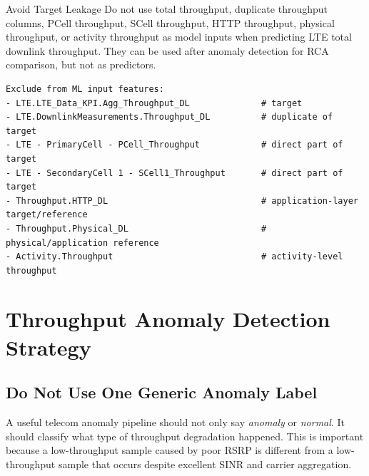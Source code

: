 \documentclass[12pt,a4paper]{article}
\begin{document}
\begin{warningbox}{Avoid Target Leakage}
Do not use total throughput, duplicate throughput columns, PCell throughput, SCell throughput, HTTP throughput, physical throughput, or activity throughput as model inputs when predicting LTE total downlink throughput. They can be used after anomaly detection for RCA comparison, but not as predictors.
\end{warningbox}

\begin{lstlisting}
Exclude from ML input features:
- LTE.LTE_Data_KPI.Agg_Throughput_DL              # target
- LTE.DownlinkMeasurements.Throughput_DL          # duplicate of target
- LTE - PrimaryCell - PCell_Throughput            # direct part of target
- LTE - SecondaryCell 1 - SCell1_Throughput       # direct part of target
- Throughput.HTTP_DL                              # application-layer target/reference
- Throughput.Physical_DL                          # physical/application reference
- Activity.Throughput                             # activity-level throughput
\end{lstlisting}

\section{Throughput Anomaly Detection Strategy}

\subsection{Do Not Use One Generic Anomaly Label}

A useful telecom anomaly pipeline should not only say \textit{anomaly} or \textit{normal}. It should classify what type of throughput degradation happened. This is important because a low-throughput sample caused by poor RSRP is different from a low-throughput sample that occurs despite excellent SINR and carrier aggregation.
\end{document}
